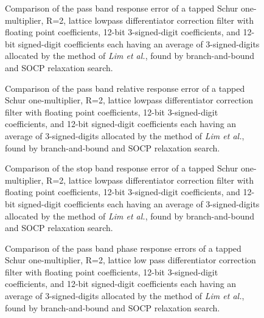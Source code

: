 \documentclass[a4paper,twoside,10pt,english]{article}
\newcommand{\DesignOfSchurLatticeFiltersPdfScale}{1}
\begin{document}
\begin{figure}
\centering
\scalebox{\DesignOfSchurLatticeFiltersPdfScale}{}
\caption{Comparison of the pass band response error of
  a tapped Schur one-multiplier, R=2, lattice lowpass differentiator correction
  filter with floating point coefficients, 12-bit 3-signed-digit coefficients,
  and 12-bit signed-digit coefficients each having an average of 3-signed-digits
  allocated by the method of \emph{Lim et al.}, found by branch-and-bound and
  SOCP relaxation search.}
\label{fig:Comp-schurOneMlattice-lowpass-diff-R2-12-nbits-pass}
\end{figure}

\begin{figure}
\centering
\scalebox{\DesignOfSchurLatticeFiltersPdfScale}{}
\caption{Comparison of the pass band relative response error of
  a tapped Schur one-multiplier, R=2, lattice lowpass differentiator correction
  filter with floating point coefficients, 12-bit 3-signed-digit coefficients,
  and 12-bit signed-digit coefficients each having an average of 3-signed-digits
  allocated by the method of \emph{Lim et al.}, found by branch-and-bound and
  SOCP relaxation search.}
\label{fig:Comp-schurOneMlattice-lowpass-diff-R2-12-nbits-relative-pass}
\end{figure}

\begin{figure}
\centering
\scalebox{\DesignOfSchurLatticeFiltersPdfScale}{}
\caption{Comparison of the stop band response error of
  a tapped Schur one-multiplier, R=2, lattice lowpass differentiator correction
  filter with floating point coefficients, 12-bit 3-signed-digit coefficients,
  and 12-bit signed-digit coefficients each having an average of 3-signed-digits
  allocated by the method of \emph{Lim et al.}, found by branch-and-bound and
  SOCP relaxation search.}
\label{fig:Comp-schurOneMlattice-lowpass-diff-R2-12-nbits-stop}
\end{figure}

\begin{figure}
\centering
\scalebox{\DesignOfSchurLatticeFiltersPdfScale}{}
\caption{Comparison of the pass band phase response errors of a tapped Schur
  one-multiplier, R=2, lattice low pass differentiator correction filter with
  floating point coefficients, 12-bit 3-signed-digit coefficients, and 12-bit
  signed-digit coefficients each having an average of 3-signed-digits allocated
  by the method of \emph{Lim et al.}, found by branch-and-bound and
  SOCP relaxation search.}
\label{fig:Comp-schurOneMlattice-lowpass-diff-R2-12-nbits-phase}
\end{figure}
\end{document}
